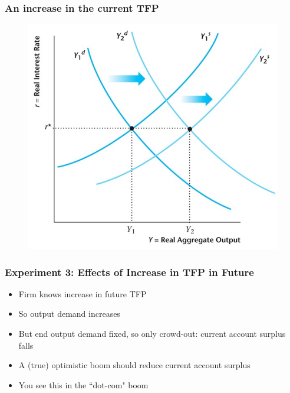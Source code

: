 \documentclass{beamer}
\begin{document}
\begin{frame}
\frametitle[alignment=center]{An increase in the current TFP}
\begin{figure}
\centering
\includegraphics[scale=0.55]{Figures/W_Fig_16pt10.png}
\end{figure}
\end{frame}

\begin{frame}
\frametitle[alignment=center]{Experiment 3: Effects of Increase in TFP in Future}
\begin{itemize}
\item Firm knows increase in future TFP
\bigskip
\item So output demand increases
\bigskip
\item But end output demand fixed, so only crowd-out: current account surplus falls
\bigskip
\item A (true) optimistic boom should reduce current account surplus
\bigskip
\item You see this in the ``dot-com" boom
\end{itemize}
\end{frame}
\end{document}
